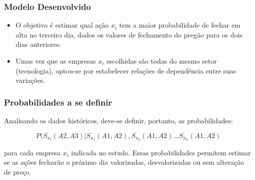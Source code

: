 \documentclass[Madrid]{beamer}
\begin{document}
\begin{frame}
	\frametitle{Modelo Desenvolvido}
	
	\begin{itemize}
		\item O objetivo é estimar qual ação $x_i$ tem a maior probabilidade de fechar em alta no terceiro dia, dados os valores de fechamento do pregão para os dois dias anteriores.
		\item Umas vez que as empresas $x_i$ escolhidas são todas do mesmo setor (tecnologia), optou-se por estabelecer relações de dependência entre suas variações.
	\end{itemize}
\end{frame}

\begin{frame}
	\frametitle{Probabilidades a se definir}
	Analisando os dados históricos, deve-se definir, portanto, as probabilidades:
	
	\begin{equation}
		P(S_{x_i}(A2, A3) | S_{x_1}(A1, A2), S_{x_2}(A1, A2) ... S_{x_n}(A1, A2) 
	\end{equation}
	
	para cada empresa $x_i$ indicada no estudo. Essas probabilidades permitem estimar se as ações fecharão o próximo dia valorizadas, desvalorizadas ou sem alteração de preço. 
\end{frame}
\end{document}
